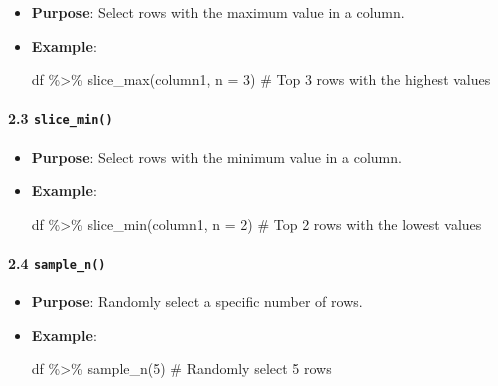 \documentclass[
  letterpaper,
  DIV=11,
  numbers=noendperiod]{scrartcl}
\let\oldparagraph\paragraph
\renewcommand{\paragraph}[1]{\oldparagraph{#1}\mbox{}}
\newenvironment{Shaded}{\begin{snugshade}}{\end{snugshade}}
\newcommand{\AttributeTok}[1]{\textcolor[rgb]{0.40,0.45,0.13}{#1}}
\newcommand{\CommentTok}[1]{\textcolor[rgb]{0.37,0.37,0.37}{#1}}
\newcommand{\DecValTok}[1]{\textcolor[rgb]{0.68,0.00,0.00}{#1}}
\newcommand{\FunctionTok}[1]{\textcolor[rgb]{0.28,0.35,0.67}{#1}}
\newcommand{\NormalTok}[1]{\textcolor[rgb]{0.00,0.23,0.31}{#1}}
\newcommand{\SpecialCharTok}[1]{\textcolor[rgb]{0.37,0.37,0.37}{#1}}
\begin{document}
\begin{itemize}
\item
  \textbf{Purpose}: Select rows with the maximum value in a column.
\item
  \textbf{Example}:

\begin{Shaded}
\begin{Highlighting}[]
\NormalTok{df }\SpecialCharTok{\%\textgreater{}\%} \FunctionTok{slice\_max}\NormalTok{(column1, }\AttributeTok{n =} \DecValTok{3}\NormalTok{)  }\CommentTok{\# Top 3 rows with the highest values}
\end{Highlighting}
\end{Shaded}
\end{itemize}

\paragraph{\texorpdfstring{\textbf{2.3
\texttt{slice\_min()}}}{2.3 slice\_min()}}\label{slice_min}

\begin{itemize}
\item
  \textbf{Purpose}: Select rows with the minimum value in a column.
\item
  \textbf{Example}:

\begin{Shaded}
\begin{Highlighting}[]
\NormalTok{df }\SpecialCharTok{\%\textgreater{}\%} \FunctionTok{slice\_min}\NormalTok{(column1, }\AttributeTok{n =} \DecValTok{2}\NormalTok{)  }\CommentTok{\# Top 2 rows with the lowest values}
\end{Highlighting}
\end{Shaded}
\end{itemize}

\paragraph{\texorpdfstring{\textbf{2.4
\texttt{sample\_n()}}}{2.4 sample\_n()}}\label{sample_n}

\begin{itemize}
\item
  \textbf{Purpose}: Randomly select a specific number of rows.
\item
  \textbf{Example}:

\begin{Shaded}
\begin{Highlighting}[]
\NormalTok{df }\SpecialCharTok{\%\textgreater{}\%} \FunctionTok{sample\_n}\NormalTok{(}\DecValTok{5}\NormalTok{)  }\CommentTok{\# Randomly select 5 rows}
\end{Highlighting}
\end{Shaded}
\end{itemize}
\end{document}
